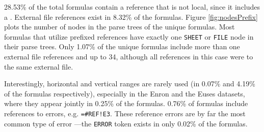 \documentclass[times]{smrauth}
\begin{document}
28.53\% of the total formulas contain a reference that is not local, since it includes a . External file references exist in 8.32\% of the formulas.  Figure \ref{fig:nodesPrefix} plots the number of  nodes in the parse trees of the unique formulas. Most formulas that utilize prefixed references have exactly one \texttt{SHEET} or \texttt{FILE} node in their parse trees. Only 1.07\% of the unique formulas include more than one external file references and up to 34, although all references in this case were to the same external file.

Interestingly, horizontal and vertical ranges are rarely used (in 0.07\% and 4.19\% of the formulas respectively), especially in the Enron and the Euses datasets, where they appear jointly in 0.25\% of the formulas. 0.76\% of formulas include references to errors, e.g. \texttt{=\#REF!E3}. These reference errors are by far the most common type of error ---the \texttt{ERROR} token exists in only 0.02\% of the formulas.
\end{document}
